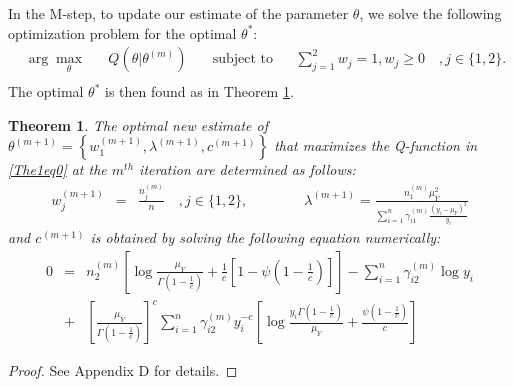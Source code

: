 \documentclass[12pt, draftclsnofoot, onecolumn]{IEEEtran}
\newtheorem{Theorem}{Theorem}
\theoremstyle{plain}
\begin{document}
In the M-step, to update our estimate of the parameter ${{{\theta}}}$, we solve the following optimization problem for the optimal ${{{{\theta}}}}^*$: \vspace{-.1in}
\begin{equation}\label{Opt1}
 \begin{aligned}
 & \arg \underset{{{{\theta}}}}{\max}
 & & Q({{{\theta}}}|{{{\theta}}}^{(m)}) \quad
 & \text{subject to}
 & & \sum_{j=1}^2 w_j=1, w_j \geq 0 \quad, j\in \{1,2\}.\\
 \end{aligned}
\end{equation}
The optimal ${{{{\theta}}}}^*$ is then found as in Theorem \ref{Theorem2b}. \vspace{-.1in}
\begin{Theorem} \label{Theorem2b} 
The optimal new estimate of ${{{\theta}}}^{(m+1)}=\left\{w_1^{(m+1)},{{{\lambda}}}^{(m+1)}, c^{(m+1)}\right\}$ that maximizes the Q-function in \eqref{The1eq0} at the $m^{th}$ iteration are determined as follows:  \vspace{-.08in}
\begin{eqnarray}
w_j^{(m+1)} &=& \frac{n_j^{(m)}}{n} \quad , j \in \{1,2\}, %
\quad \quad \quad \quad
{{{\lambda}}}^{(m+1)} = \frac{n_1^{(m)} \mu_Y^2}{\sum_{i=1}^n \gamma_{i1}^{(m)} \frac{(y_i-\mu_Y)^2}{y_i}}  \label{Muj}
\end{eqnarray}
%
and ${{c_{}}}^{(m+1)}$ is obtained by solving the following equation numerically: \vspace{-.1in}
%
{\small
\begin{eqnarray}
0 &=& n_2^{(m)} \left[ \log \frac{\mu_Y}{\Gamma(1-\frac{1}{{{c_{}}}})} + \frac{1}{{{c_{}}}} \left[ 1- \psi \left(1-\frac{1}{{{c_{}}}} \right)\right] \right] - \sum_{i=1}^n \gamma_{i2}^{(m)} \log y_i \nonumber\\
&+& \left[ \frac{\mu_Y}{\Gamma \left( 1- \frac{1}{{{c_{}}}} \right)} \right]^{{{c_{}}}} \sum_{i=1}^n \gamma_{i2}^{(m)} y_i^{-{{c_{}}}} \left[ \log \frac{y_i \Gamma(1-\frac{1}{{{c_{}}}})}{\mu_Y} + \frac{\psi(1-\frac{1}{{{c_{}}}})}{{{c_{}}}}\right] \label{C_IW}
\end{eqnarray}}
\end{Theorem}\vspace{-.05in}
\begin{proof}
See Appendix D for details.
\end{proof}
\end{document}
